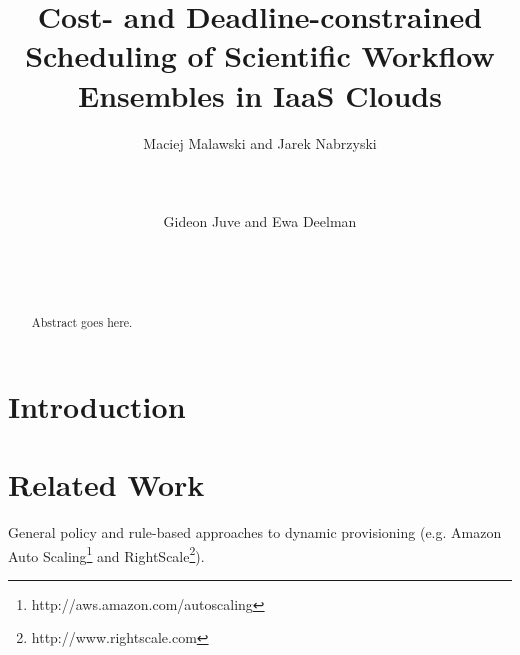 \documentclass{sig-alternate}
\begin{document}

\title{Cost- and Deadline-constrained Scheduling of Scientific Workflow Ensembles in IaaS Clouds}

\author{
    \alignauthor Maciej Malawski and Jarek Nabrzyski\\
       \\
       \\
       \\
    \alignauthor Gideon Juve and Ewa Deelman\\
       \\
       \\
       \\
}

\maketitle

\begin{abstract}
Abstract goes here.
\end{abstract}




\section{Introduction}


\section{Related Work}
General policy and rule-based approaches to dynamic provisioning (e.g. Amazon Auto Scaling\footnote{http://aws.amazon.com/autoscaling} and RightScale\footnote{http://www.rightscale.com}).
\end{document}
